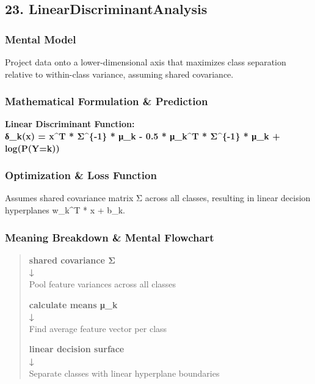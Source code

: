 \documentclass[
  10pt,
  letterpaper,
]{article}
\begin{document}
\hypertarget{lineardiscriminantanalysis}{%
\subsection{23. LinearDiscriminantAnalysis}\label{lineardiscriminantanalysis}}

\hypertarget{mental-model-22}{%
\subsubsection{Mental Model}\label{mental-model-22}}

Project data onto a lower-dimensional axis that maximizes class separation relative to within-class variance, assuming shared covariance.

\hypertarget{mathematical-formulation-prediction-22}{%
\subsubsection{Mathematical Formulation \& Prediction}\label{mathematical-formulation-prediction-22}}

\textbf{Linear Discriminant Function:\\
δ\_k(x) = x\^{}T * Σ\^{}\{-1\} * μ\_k - 0.5 * μ\_k\^{}T * Σ\^{}\{-1\} * μ\_k + log(P(Y=k))}

\hypertarget{optimization-loss-function-22}{%
\subsubsection{Optimization \& Loss Function}\label{optimization-loss-function-22}}

Assumes shared covariance matrix Σ across all classes, resulting in linear decision hyperplanes w\_k\^{}T * x + b\_k.

\hypertarget{meaning-breakdown-mental-flowchart-22}{%
\subsubsection{Meaning Breakdown \& Mental Flowchart}\label{meaning-breakdown-mental-flowchart-22}}

\begin{quote}
\textbf{shared covariance Σ\\
↓\\
}Pool feature variances across all classes

\textbf{calculate means μ\_k\\
↓\\
}Find average feature vector per class

\textbf{linear decision surface\\
↓\\
}Separate classes with linear hyperplane boundaries
\end{quote}
\end{document}
